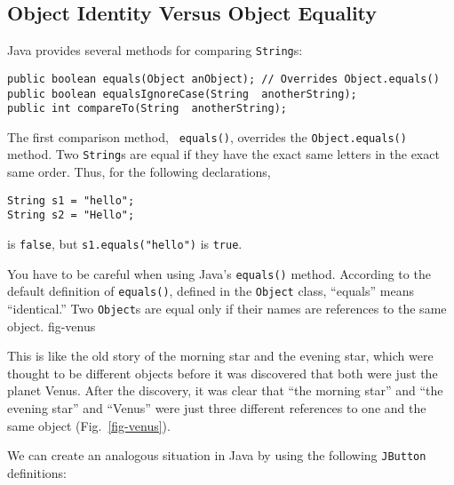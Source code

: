 \subsection{Object Identity Versus Object Equality}
\noindent Java provides several methods for comparing {\tt String}s:

\begin{jjjlisting}
\begin{lstlisting}
public boolean equals(Object anObject); // Overrides Object.equals()
public boolean equalsIgnoreCase(String  anotherString);
public int compareTo(String  anotherString);
\end{lstlisting}
\end{jjjlisting}

\noindent The first comparison method, {\tt
equals()}, overrides the {\tt Object.equals()}
method.  Two {\tt String}s are equal if they have the exact same
letters in the exact same  order.
Thus, for the following declarations,

\begin{jjjlisting}
\begin{lstlisting}
String s1 = "hello";
String s2 = "Hello";
\end{lstlisting}
\end{jjjlisting}

 is {\tt false}, but \verb|s1.equals("hello")|
is {\tt true}.

You have to be careful when using Java's {\tt equals()}
method.  According to the default definition of {\tt equals()}, defined
in the {\tt Object} class, ``equals'' means ``identical.''  Two
{\tt Object}s are equal only if their names are references to the same
object.
{fig-venus}

This is like the old story of the morning star and the evening star,
which were thought to be different objects before it was discovered
that both were just the planet Venus.  After the discovery, it was
clear that ``the morning star'' and ``the evening star'' and ``Venus'' were
just three different references to one and the same object
(Fig.~\ref{fig-venus}).

We can create an analogous situation in Java by using the following
{\tt JButton} definitions:

